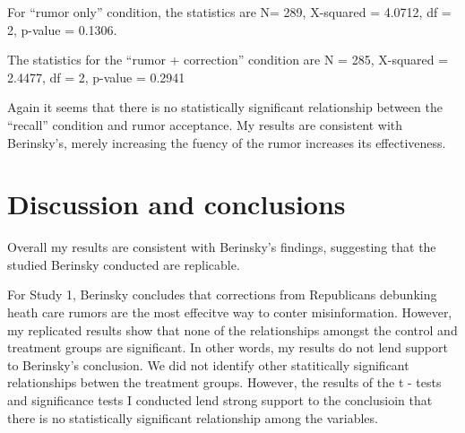 \documentclass[AER]{AEA}
\begin{document}
\begin{table}

\caption{\label{tab:unnamed-chunk-18}Recall effects on rumor only conditiion in Study 2 (Wave 2)}
\centering
{}
\end{table}

For ``rumor only'' condition, the statistics are N= 289, X-squared =
4.0712, df = 2, p-value = 0.1306.

\begin{table}

\caption{\label{tab:unnamed-chunk-19}Recall effects on rumor + correction conditiion in Study 2 (Wave 2)}
\centering
{}
\end{table}

The statistics for the ``rumor + correction'' condition are N = 285,
X-squared = 2.4477, df = 2, p-value = 0.2941

Again it seems that there is no statistically significant relationship
between the ``recall'' condition and rumor acceptance. My results are
consistent with Berinsky's, merely increasing the fuency of the rumor
increases its effectiveness.

\hypertarget{discussion-and-conclusions}{%
\section{Discussion and conclusions}\label{discussion-and-conclusions}}

Overall my results are consistent with Berinsky's findings, suggesting
that the studied Berinsky conducted are replicable.

For Study 1, Berinsky concludes that corrections from Republicans
debunking heath care rumors are the most effecitve way to conter
misinformation. However, my replicated results show that none of the
relationships amongst the control and treatment groups are significant.
In other words, my results do not lend support to Berinsky's conclusion.
We did not identify other statitically significant relationships betwen
the treatment groups. However, the results of the t - tests and
significance tests I conducted lend strong support to the conclusioin
that there is no statistically significant relationship among the
variables.
\end{document}

